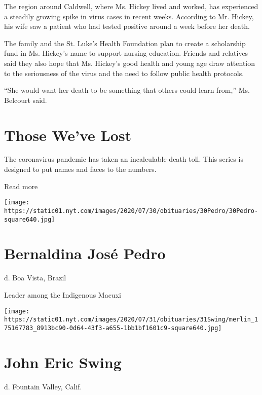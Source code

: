 The region around Caldwell, where Ms. Hickey lived and worked, has
experienced a steadily growing spike in virus cases in recent weeks.
According to Mr. Hickey, his wife saw a patient who had tested positive
around a week before her death.

The family and the St. Luke's Health Foundation plan to create a
scholarship fund in Ms. Hickey's name to support nursing education.
Friends and relatives said they also hope that Ms. Hickey's good health
and young age draw attention to the seriousness of the virus and the
need to follow public health protocols.

``She would want her death to be something that others could learn
from,'' Ms. Belcourt said.

\href{https://www.nytimes.com/interactive/2020/obituaries/people-died-coronavirus-obituaries.html?action=click\&pgtype=Article\&state=default\&region=BELOW_MAIN_CONTENT\&context=covid_obits_promo}{}

\hypertarget{those-weve-lost}{%
\section{Those We've Lost}\label{those-weve-lost}}

The coronavirus pandemic has taken an incalculable death toll. This
series is designed to put names and faces to the numbers.

Read more

\texttt{[image: https://static01.nyt.com/images/2020/07/30/obituaries/30Pedro/30Pedro-square640.jpg]}

\hypertarget{bernaldina-josuxe9-pedro}{%
\section{Bernaldina José Pedro}\label{bernaldina-josuxe9-pedro}}

d. Boa Vista, Brazil

Leader among the Indigenous Macuxi

\texttt{[image: https://static01.nyt.com/images/2020/07/31/obituaries/31Swing/merlin\_175167783\_8913bc90-0d64-43f3-a655-1bb1bf1601c9-square640.jpg]}

\hypertarget{john-eric-swing}{%
\section{John Eric Swing}\label{john-eric-swing}}

d. Fountain Valley, Calif.

